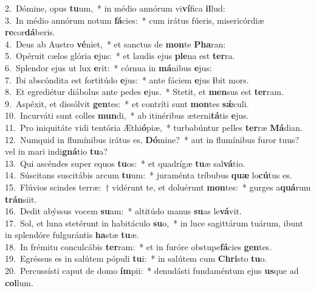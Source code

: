 {2.~}Dómine, opus \textbf{tu}um,~* in médio annórum vi\textbf{ví}fica \textbf{il}lud:\\
{3.~}In médio annórum notum \textbf{fá}cies:~* cum irátus fúeris, misericórdiæ \textbf{re}cor\textbf{dá}beris.\\
{4.~}Deus ab Austro \textbf{vé}niet,~* et sanctus de \textbf{mon}te \textbf{Pha}ran:\\
{5.~}Opéruit cælos glória \textbf{e}jus:~* et laudis ejus \textbf{ple}na est \textbf{ter}ra.\\
{6.~}Splendor ejus ut lux \textbf{e}rit:~* córnua in \textbf{má}nibus \textbf{e}jus:\\
{7.~}Ibi abscóndita est fortitúdo \textbf{e}jus:~* ante fáciem \textbf{e}jus \textbf{i}bit mors.\\
{8.~}Et egrediétur diábolus ante pedes \textbf{e}jus.~* Stetit, et \textbf{men}sus est \textbf{ter}ram.\\
{9.~}Aspéxit, et dissólvit \textbf{gen}tes:~* et contríti sunt \textbf{mon}tes \textbf{sǽ}culi.\\
{10.~}Incurváti sunt colles \textbf{mun}di,~* ab itinéribus æterni\textbf{tá}tis \textbf{e}jus.\\
{11.~}Pro iniquitáte vidi tentória Æthi\textbf{ó}piæ,~* turbabúntur pelles \textbf{ter}ræ \textbf{Má}dian.\\
{12.~}Numquid in flumínibus irátus es, \textbf{Dó}mine?~* aut in flumínibus furor tuus? vel in mari indi\textbf{gná}tio \textbf{tu}a?\\
{13.~}Qui ascéndes super equos \textbf{tu}os:~* et quadrígæ \textbf{tu}æ sal\textbf{vá}tio.\\
{14.~}Súscitans suscitábis arcum \textbf{tu}um:~* juraménta tríbubus \textbf{quæ} lo\textbf{cú}tus es.\\
{15.~}Flúvios scindes terræ:~† vidérunt te, et doluérunt \textbf{mon}tes:~* gurges a\textbf{quá}rum \textbf{trán}siit.\\
{16.~}Dedit abýssus vocem \textbf{su}am:~* altitúdo manus \textbf{su}as le\textbf{vá}vit.\\
{17.~}Sol, et luna stetérunt in habitáculo \textbf{su}o,~* in luce sagittárum tuárum, ibunt in splendóre fulgurántis \textbf{ha}stæ \textbf{tu}æ.\\
{18.~}In frémitu conculcábis \textbf{ter}ram:~* et in furóre obstupe\textbf{fá}cies \textbf{gen}tes.\\
{19.~}Egréssus es in salútem pópuli \textbf{tu}i:~* in salútem cum \textbf{Chri}sto \textbf{tu}o.\\
{20.~}Percussísti caput de domo \textbf{ím}pii:~* denudásti fundaméntum ejus \textbf{us}que ad \textbf{col}lum.\\
